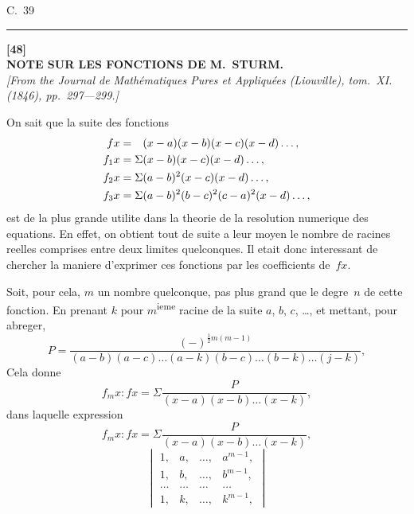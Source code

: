 \documentclass[11pt,a4paper]{article}
\begin{document}
\begin{center}
C.~39
\end{center}

\vspace{20pt}
\begin{center}
\rule{0.5\textwidth}{0.4pt}
\end{center}


\newpage
\begin{center}
\textbf{[48]}\\[4pt]
\textbf{\large NOTE SUR LES FONCTIONS DE M.\ STURM.}\\[4pt]
\textit{[From the Journal de Math\'ematiques Pures et Appliqu\'ees (Liouville), tom.~XI. (1846), pp.~297---299.]}
\end{center}

\vspace{6pt}

On sait que la suite des fonctions
\begin{align*}
fx &= \hphantom{\Sigma}(x-a)(x-b)(x-c)(x-d)\ldots,\\
f_1x &= \Sigma(x-b)(x-c)(x-d)\ldots,\\
f_2x &= \Sigma(a-b)^2(x-c)(x-d)\ldots,\\
f_3x &= \Sigma(a-b)^2(b-c)^2(c-a)^2(x-d)\ldots,
\end{align*}
est de la plus grande utilite dans la theorie de la resolution numerique des equations. En effet, on obtient tout de suite a leur moyen le nombre de racines reelles comprises entre deux limites quelconques. Il etait donc interessant de chercher la maniere d'exprimer ces fonctions par les coefficients de~$fx$.

Soit, pour cela, $m$ un nombre quelconque, pas plus grand que le degre~$n$ de cette fonction. En prenant $k$ pour $m$\textsuperscript{ieme} racine de la suite $a$, $b$, $c$, \ldots, et mettant, pour abreger,
\[
P = \frac{(-)^{\frac{1}{2}m(m-1)}}{(a-b)(a-c)\ldots(a-k)(b-c)\ldots(b-k)\ldots(j-k)},
\]
Cela donne
\[
f_m x : fx = \Sigma \frac{P}{(x-a)(x-b)\ldots(x-k)},
\]
dans laquelle expression
\[
f_m x : fx = \Sigma \frac{P}{(x-a)(x-b)\ldots(x-k)},
\]
\[
\begin{vmatrix}
1, & a, & \ldots, & a^{m-1},\\
1, & b, & \ldots, & b^{m-1},\\
\ldots & \ldots & \ldots & \ldots\\
1, & k, & \ldots, & k^{m-1},
\end{vmatrix}
\]
\end{document}
